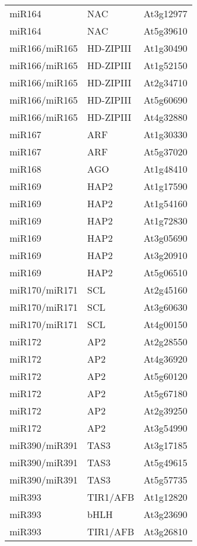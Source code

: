 \begin{table}
\begin{tabular}{lll}
miR164        & NAC          & At3g12977 \\
miR164        & NAC          & At5g39610 \\
miR166/miR165 & HD-ZIPIII    & At1g30490 \\
miR166/miR165 & HD-ZIPIII    & At1g52150 \\
miR166/miR165 & HD-ZIPIII    & At2g34710 \\
miR166/miR165 & HD-ZIPIII    & At5g60690 \\
miR166/miR165 & HD-ZIPIII    & At4g32880 \\
miR167        & ARF          & At1g30330 \\
miR167        & ARF          & At5g37020 \\
miR168        & AGO          & At1g48410 \\
miR169        & HAP2         & At1g17590 \\
miR169        & HAP2         & At1g54160 \\
miR169        & HAP2         & At1g72830 \\
miR169        & HAP2         & At3g05690 \\
miR169        & HAP2         & At3g20910 \\
miR169        & HAP2         & At5g06510 \\
miR170/miR171 & SCL          & At2g45160 \\
miR170/miR171 & SCL          & At3g60630 \\
miR170/miR171 & SCL          & At4g00150 \\
miR172        & AP2          & At2g28550 \\
miR172        & AP2          & At4g36920 \\
miR172        & AP2          & At5g60120 \\
miR172        & AP2          & At5g67180 \\
miR172        & AP2          & At2g39250 \\
miR172        & AP2          & At3g54990 \\
miR390/miR391 & TAS3         & At3g17185 \\
miR390/miR391 & TAS3         & At5g49615 \\
miR390/miR391 & TAS3         & At5g57735 \\
miR393        & TIR1/AFB     & At1g12820 \\
miR393        & bHLH         & At3g23690 \\
miR393        & TIR1/AFB     & At3g26810 \\

\end{tabular}
\end{table}
